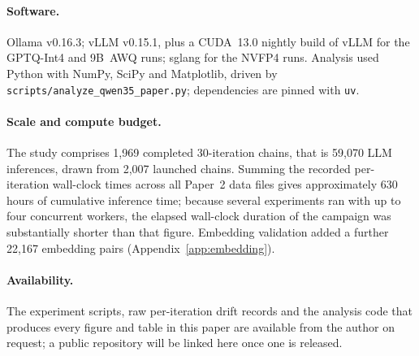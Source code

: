\documentclass[11pt]{article}
\begin{document}
\paragraph{Software.}
Ollama v0.16.3; vLLM v0.15.1, plus a CUDA~13.0 nightly build of vLLM for the
GPTQ-Int4 and 9B~AWQ runs; sglang for the NVFP4 runs. Analysis used Python
with NumPy, SciPy and Matplotlib, driven by
\texttt{scripts/\allowbreak analyze\_qwen35\_paper.py}; dependencies are pinned with
\texttt{uv}.

\paragraph{Scale and compute budget.}
The study comprises 1{,}969 completed 30-iteration chains, that is 59{,}070
LLM inferences, drawn from 2{,}007 launched chains. Summing the recorded
per-iteration wall-clock times across all Paper~2 data files gives
approximately 630 hours of cumulative inference time; because several
experiments ran with up to four concurrent workers, the elapsed wall-clock
duration of the campaign was substantially shorter than that figure.
Embedding validation added a further 22{,}167 embedding pairs
(Appendix~\ref{app:embedding}).

\paragraph{Availability.}
The experiment scripts, raw per-iteration drift records and the analysis
code that produces every figure and table in this paper are available from
the author on request; a public repository will be linked here once one is
released.
\end{document}
